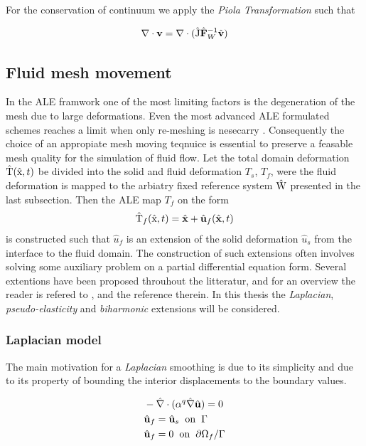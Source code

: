 For the conservation of continuum we apply the \textit{Piola Transformation} such that

\begin{align*}
\nabla \cdot \mathbf{v} = \nabla \cdot (\ha{J} \hat{F}_W^{-1} \hat{v})
\end{align*}

\subsection*{Fluid mesh movement}
In the ALE framwork one of the most limiting factors is the degeneration of the mesh due to large deformations. Even the most advanced ALE formulated schemes reaches a limit when only re-meshing is nesecarry \cite{Wall12006}. Consequently the choice of an appropiate mesh moving teqnuice is essential to preserve a feasable mesh quality for the simulation of fluid flow. Let the total domain deformation $\text{\^{T}}(\text{\^{x}}, t)$ be divided into the solid and fluid deformation $T_s$, $T_f$, were the fluid deformation is mapped to the arbiatry fixed reference system $\text{\^{W}}$ presented in the last subsection.  
Then the ALE map $T_f$ on the form 
\begin{align*}
\ha{T}_f(\ha{x}, t) = \hat{x} + \hat{u}_f(\hat{x}, t)
\end{align*}
is constructed such that $\hat{u}_f$ is an extension of the solid deformation $\hat{u}_s$ from the interface to the fluid domain. The construction of such extensions often involves solving some auxiliary problem on a partial differential equation form.  Several extentions have been proposed throuhout the litteratur, and for an overview the reader is refered to \cite{MM2016}, and the reference therein. In this thesis the \textit{Laplacian}, \textit{pseudo-elasticity} and \textit{biharmonic} extensions will be considered. \\

\subsubsection*{Laplacian model}

The main motivation for a \textit{Laplacian} smoothing is due to its simplicity and due to its property 
of bounding the interior displacements to the boundary values. 

\begin{align*}
&- \hat{\nabla} \cdot (\alpha^q \hat{\nabla} \hat{u}) = 0 \\
&\hat{u}_f = \hat{u}_s \hspace{2mm} \text{on} \hspace{2mm}  \Gamma \\
&\hat{u}_f = 0 \hspace{2mm} \text{on} \hspace{2mm} \partial \Omega_f / \Gamma
\end{align*}

